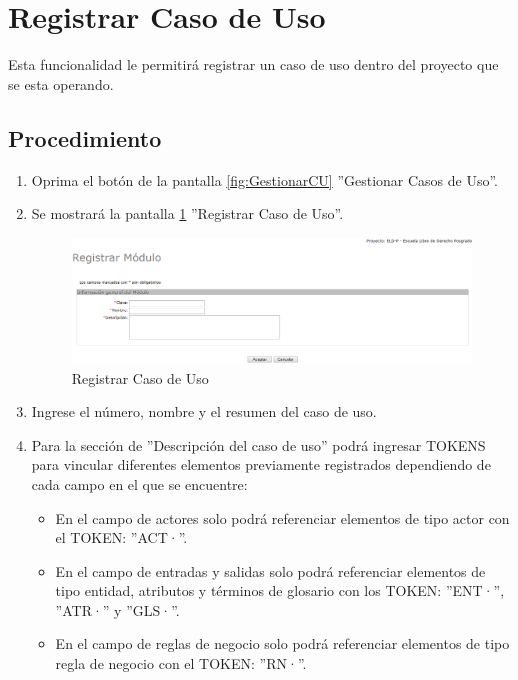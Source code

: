 
\hypertarget{cv:registrarCU}{\section{Registrar Caso de Uso}} \label{sec:registrarCU}

	Esta funcionalidad le permitirá registrar un caso de uso dentro del proyecto que se esta operando.

		\subsection{Procedimiento}

			\begin{enumerate}
	
			\item Oprima el botón \IURegistrar{} de la pantalla \ref{fig:GestionarCU} ''Gestionar Casos de Uso''.
			
			\item Se mostrará la pantalla \ref{fig:registrarCU} ''Registrar Caso de Uso''.

			\begin{figure}[htbp!]
				\begin{center}
					\includegraphics[scale=0.5]{roles/lider/casosUso/pantallas/IU5-1registrarModulo}
					\caption{Registrar Caso de Uso}
					\label{fig:registrarCU}
				\end{center}
			\end{figure}
		
			\item Ingrese el número, nombre  y el resumen del caso de uso.
			
			\item Para la sección de ''Descripción del caso de uso'' podrá ingresar TOKENS para vincular diferentes elementos previamente registrados dependiendo de cada campo en el que se encuentre:
			
			\begin{itemize}
				\item En el campo de actores solo podrá referenciar elementos de tipo actor con el TOKEN: ''ACT·''.
				\item En el campo de entradas y salidas solo podrá referenciar elementos de tipo entidad, atributos y términos de glosario con los TOKEN: ''ENT·'', ''ATR·'' y ''GLS·''.
				\item En el campo de reglas de negocio solo podrá referenciar elementos de tipo regla de negocio con el TOKEN: ''RN·''.
			\end{itemize}
			

\end{enumerate}

